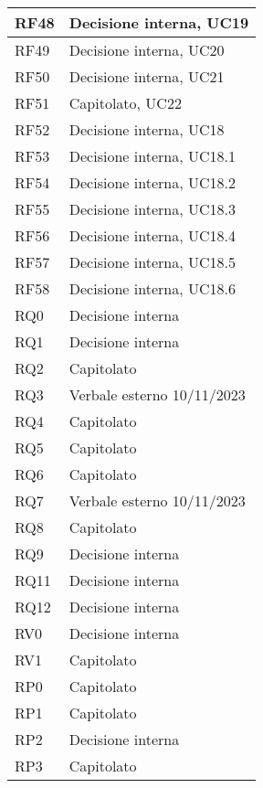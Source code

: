 \begin{center}
\begin{longtable}{|C{5cm}|C{5cm}|}
        \hline
        RF48 & Decisione interna, UC19 \\
        \hline
        RF49 & Decisione interna, UC20 \\
        \hline
        RF50 & Decisione interna, UC21 \\
        \hline
        RF51 & Capitolato, UC22 \\
        \hline
        RF52 & Decisione interna, UC18 \\
        \hline
        RF53 & Decisione interna, UC18.1 \\
        \hline
        RF54 & Decisione interna, UC18.2 \\
        \hline
        RF55 & Decisione interna, UC18.3 \\
        \hline
        RF56 & Decisione interna, UC18.4 \\
        \hline
        RF57 & Decisione interna, UC18.5 \\
        \hline
        RF58 & Decisione interna, UC18.6 \\
        \hline
        RQ0 & Decisione interna \\
        \hline
        RQ1 & Decisione interna \\
        \hline
        RQ2 & Capitolato \\
        \hline
        RQ3 & Verbale esterno 10/11/2023 \\
        \hline
        RQ4 & Capitolato \\
        \hline
        RQ5 & Capitolato \\
        \hline
        RQ6 & Capitolato \\
        \hline
        RQ7 & Verbale esterno 10/11/2023 \\
        \hline
        RQ8 & Capitolato \\
        \hline
        RQ9 &  Decisione interna \\
        \hline
        RQ11 & Decisione interna \\
        \hline
        RQ12 & Decisione interna \\
        \hline
        RV0 & Decisione interna \\
        \hline
        RV1 & Capitolato \\
        \hline
        RP0 & Capitolato \\
        \hline
        RP1 & Capitolato \\
        \hline
        RP2 & Decisione interna \\
        \hline
        RP3 & Capitolato \\
        \hline
    \end{longtable}
\end{center}



